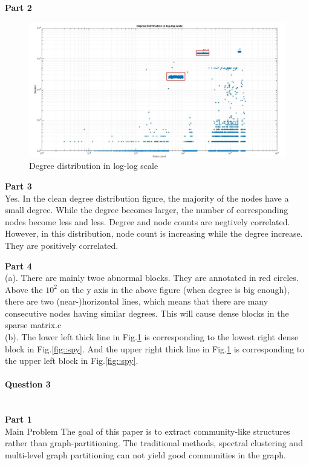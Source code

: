 \documentclass[11pt]{article}
\begin{document}
\noindent
\textbf{Part 2} \\
\begin{figure}[H]
    \centering
    \includegraphics[width=\linewidth]{figs/q2.jpg}
    \caption{Degree distribution in log-log scale}
    \label{fig::deg_log}
\end{figure}

\noindent
\textbf{Part 3} \\
Yes. In the clean degree distribution figure, the majority of the nodes have a small degree. While the degree becomes larger, the number of corresponding nodes become less and less. Degree and node counts are negtively correlated. However, in this distribution, node count is increasing while the degree increase. They are positively correlated.

\noindent
\textbf{Part 4} \\
(a). There are mainly twoe abnormal blocks. They are annotated in red circles. Above the $10^2$ on the y axis in the above figure (when degree is big enough), there are two (near-)horizontal lines, which means that there are many consecutive nodes having similar degrees. This will cause dense blocks in the sparse matrix.c \\
\noindent
(b). The lower left thick line in Fig.\ref{fig::deg_log} is corresponding to the lowest right dense block in Fig.\ref{fig::spy}. And the upper right thick line in Fig.\ref{fig::deg_log} is corresponding to the upper left block in Fig.\ref{fig::spy}.

\paragraph{Question 3}\mbox{} \\
\noindent
\textbf{Part 1} \\
\noindent
Main Problem \newline
The goal of this paper is to extract community-like structures rather than graph-partitioning. The traditional methods, spectral clustering and multi-level graph partitioning can not yield good communities in the graph.
\end{document}
